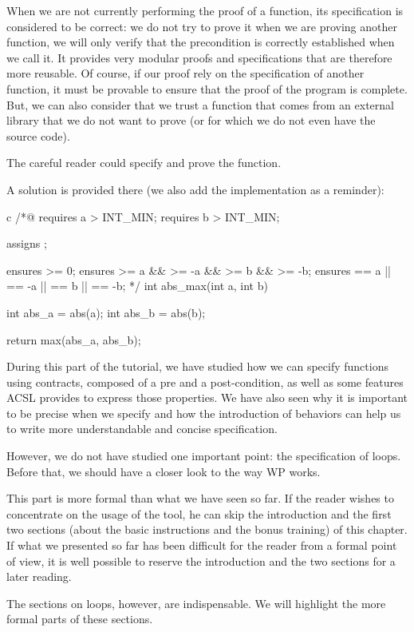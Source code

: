 \documentclass[middle]{zmdocument}
\begin{document}
When we are not currently performing the proof of a function, its
specification is considered to be correct: we do not try to prove it
when we are proving another function, we will only verify that the
precondition is correctly established when we call it. It provides very
modular proofs and specifications that are therefore more reusable. Of
course, if our proof rely on the specification of another function, it
must be provable to ensure that the proof of the program is complete.
But, we can also consider that we trust a function that comes from an
external library that we do not want to prove (or for which we do not
even have the source code).

The careful reader could specify and prove the 
function.

A solution is provided there (we also add the implementation as a
reminder):



\begin{CodeBlock}{c}
/*@
  requires a > INT_MIN;
  requires b > INT_MIN;

  assigns \nothing;

  ensures \result >= 0;
  ensures \result >= a && \result >= -a && \result >= b && \result >= -b;
  ensures \result == a || \result == -a || \result == b || \result == -b;
*/
int abs_max(int a, int b){
  int abs_a = abs(a);
  int abs_b = abs(b);

  return max(abs_a, abs_b);
}
\end{CodeBlock}



\horizontalLine



During this part of the tutorial, we have studied how we can specify
functions using contracts, composed of a pre and a post-condition, as
well as some features ACSL provides to express those properties. We have
also seen why it is important to be precise when we specify and how the
introduction of behaviors can help us to write more understandable and
concise specification.

However, we do not have studied one important point: the specification
of loops. Before that, we should have a closer look to the way WP works.





\begin{Information}
  This part is more formal than what we have seen so far. If the reader
  wishes to concentrate on the usage of the tool, he can skip the
  introduction and the first two sections (about the basic instructions
  and the bonus training) of this chapter. If what we presented so far has
  been difficult for the reader from a formal point of view,
  it is well possible to reserve the introduction and the two
  sections for a later reading.

  The sections on loops, however, are indispensable. We will highlight
  the more formal parts of these sections.
\end{Information}
\end{document}
